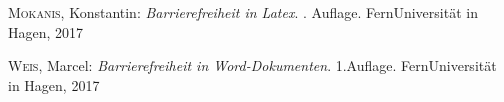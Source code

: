 \begin{thebibliography}{99}
\bibitem{}
 \textsc{Mokanis}, Konstantin:
  \newblock \emph{Barrierefreiheit in Latex}.
  . Auflage.
  \newblock FernUniversität in Hagen, 2017

\bibitem{}
\textsc{Weis}, Marcel:
\newblock \emph{Barrierefreiheit in Word-Dokumenten}.
\newblock 1.Auflage.
\newblock FernUniversität in Hagen, 2017
\end{thebibliography}